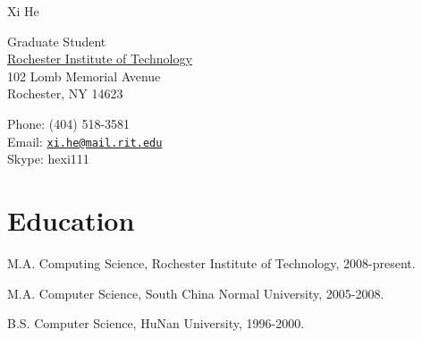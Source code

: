 \documentclass[10pt,letterpaper]{article}
\def\name{Xi He}
\renewenvironment{itemize}{
  \begin{list}{}{
    \setlength{\leftmargin}{1.5em}
  }
}{
  \end{list}
}
\begin{document}
{\huge \name}


\vspace{0.25in}

\begin{minipage}[t]{0.5\textwidth}
  {Graduate Student}\\
  \href{http://www.rit.edu/}{Rochester Institute of Technology} \\
 102 Lomb Memorial Avenue\\
  Rochester, NY  14623  \\
\end{minipage}
\begin{minipage}[t]{0.5\textwidth}
  Phone: (404) 518-3581 \\
  Email: \href{mailto:xi.he@mail.rit.edu}{\tt xi.he@mail.rit.edu} \\
  Skype: hexi111
\end{minipage}

\section*{Education}

\begin{itemize}
  \item M.A. Computing Science, Rochester Institute of Technology,  2008-present.

  \item M.A. Computer Science, South China Normal University, 2005-2008.

  \item B.S. Computer Science, HuNan University, 1996-2000.

\end{itemize}
\end{document}
